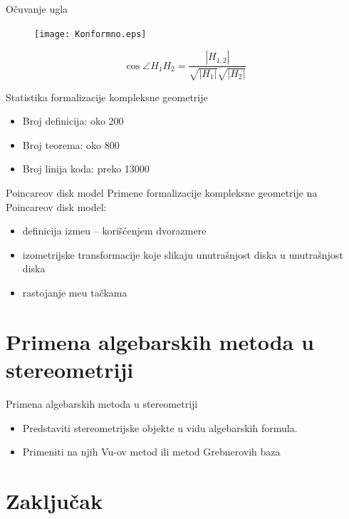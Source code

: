 \documentclass{beamer}
\begin{document}
\begin{frame}{O\v cuvanje ugla}
\begin{figure}[!h]
\begin{center}
\texttt{[image: Konformno.eps]}
\end{center}
\end{figure}

$$\cos \angle H_1H_2 = \frac{|H_{1,2}|}{\sqrt{|H_1|}\sqrt{|H_2|}}$$
\end{frame}

\begin{frame}{Statistika formalizacije kompleksne geometrije}
\begin{itemize}
\item Broj definicija: oko 200
\item Broj teorema: oko 800
\item Broj linija koda: preko 13000
\end{itemize}
\end{frame}

\begin{frame}{Poincareov disk model}
Primene formalizacije kompleksne geometrije na Poincareov disk model: 
\begin{itemize}
\item definicija izme\dj u -- kori\v s\'cenjem dvorazmere
\item izometrijske transformacije koje slikaju unutra\v snjost diska u unutra\v snjost diska
\item rastojanje me\dj u ta\v ckama
\end{itemize}
\end{frame}

\section{Primena algebarskih metoda u stereometriji}

\begin{frame}{Primena algebarskih metoda u stereometriji}
\begin{itemize}
\item Predstaviti stereometrijske objekte u vidu algebarskih formula.
\item Primeniti na njih Vu-ov metod ili metod Grebnerovih baza
\end{itemize}
\end{frame}

\section{Zaklju\v cak}
\end{document}
